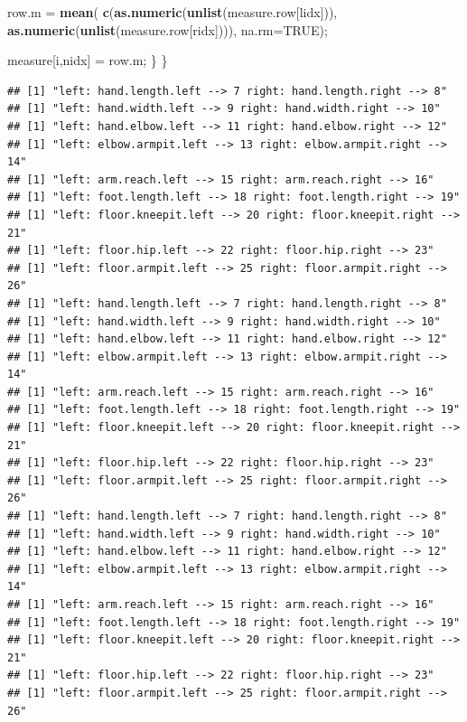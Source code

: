 \documentclass[]{article}
\newenvironment{Shaded}{\begin{snugshade}}{\end{snugshade}}
\newcommand{\DataTypeTok}[1]{\textcolor[rgb]{0.13,0.29,0.53}{#1}}
\newcommand{\KeywordTok}[1]{\textcolor[rgb]{0.13,0.29,0.53}{\textbf{#1}}}
\newcommand{\NormalTok}[1]{#1}
\newcommand{\OtherTok}[1]{\textcolor[rgb]{0.56,0.35,0.01}{#1}}
\newcommand{\StringTok}[1]{\textcolor[rgb]{0.31,0.60,0.02}{#1}}
\begin{document}
\begin{Shaded}
\begin{Highlighting}[]
\NormalTok{      row.m =}\StringTok{ }\KeywordTok{mean}\NormalTok{(}
            \KeywordTok{c}\NormalTok{(}\KeywordTok{as.numeric}\NormalTok{(}\KeywordTok{unlist}\NormalTok{(measure.row[lidx])),}
            \KeywordTok{as.numeric}\NormalTok{(}\KeywordTok{unlist}\NormalTok{(measure.row[ridx]))),}
            \DataTypeTok{na.rm=}\OtherTok{TRUE}\NormalTok{);}
      
\NormalTok{    measure[i,nidx] =}\StringTok{  }\NormalTok{row.m;}
\NormalTok{    \}}
\NormalTok{\}}
\end{Highlighting}
\end{Shaded}

\begin{verbatim}
## [1] "left: hand.length.left --> 7 right: hand.length.right --> 8"
## [1] "left: hand.width.left --> 9 right: hand.width.right --> 10"
## [1] "left: hand.elbow.left --> 11 right: hand.elbow.right --> 12"
## [1] "left: elbow.armpit.left --> 13 right: elbow.armpit.right --> 14"
## [1] "left: arm.reach.left --> 15 right: arm.reach.right --> 16"
## [1] "left: foot.length.left --> 18 right: foot.length.right --> 19"
## [1] "left: floor.kneepit.left --> 20 right: floor.kneepit.right --> 21"
## [1] "left: floor.hip.left --> 22 right: floor.hip.right --> 23"
## [1] "left: floor.armpit.left --> 25 right: floor.armpit.right --> 26"
## [1] "left: hand.length.left --> 7 right: hand.length.right --> 8"
## [1] "left: hand.width.left --> 9 right: hand.width.right --> 10"
## [1] "left: hand.elbow.left --> 11 right: hand.elbow.right --> 12"
## [1] "left: elbow.armpit.left --> 13 right: elbow.armpit.right --> 14"
## [1] "left: arm.reach.left --> 15 right: arm.reach.right --> 16"
## [1] "left: foot.length.left --> 18 right: foot.length.right --> 19"
## [1] "left: floor.kneepit.left --> 20 right: floor.kneepit.right --> 21"
## [1] "left: floor.hip.left --> 22 right: floor.hip.right --> 23"
## [1] "left: floor.armpit.left --> 25 right: floor.armpit.right --> 26"
## [1] "left: hand.length.left --> 7 right: hand.length.right --> 8"
## [1] "left: hand.width.left --> 9 right: hand.width.right --> 10"
## [1] "left: hand.elbow.left --> 11 right: hand.elbow.right --> 12"
## [1] "left: elbow.armpit.left --> 13 right: elbow.armpit.right --> 14"
## [1] "left: arm.reach.left --> 15 right: arm.reach.right --> 16"
## [1] "left: foot.length.left --> 18 right: foot.length.right --> 19"
## [1] "left: floor.kneepit.left --> 20 right: floor.kneepit.right --> 21"
## [1] "left: floor.hip.left --> 22 right: floor.hip.right --> 23"
## [1] "left: floor.armpit.left --> 25 right: floor.armpit.right --> 26"

\end{verbatim}
\end{document}
